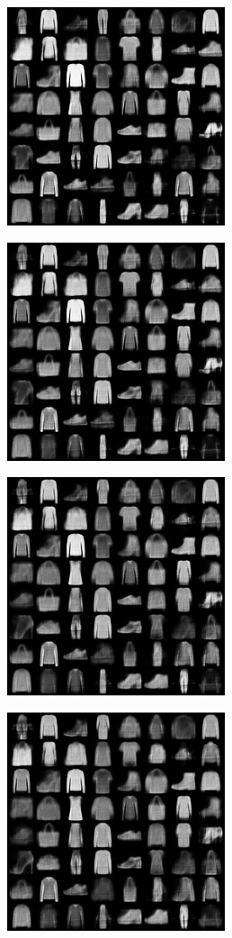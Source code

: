 \begin{figure}[htbp]
    \centering
    \begin{subfigure}
        \centering
        \includegraphics[width=0.32\linewidth]{../images/vae-0.10-merge.png}
        \label{fig:vae_0.1}
    \end{subfigure}
    \begin{subfigure}
        \centering
        \includegraphics[width=0.32\linewidth]{../images/vae-0.20-merge.png}
        \label{fig:vae_0.2}
    \end{subfigure}
    \begin{subfigure}
        \centering
        \includegraphics[width=0.32\linewidth]{../images/vae-0.30-merge.png}
        \label{fig:vae_0.3}
    \end{subfigure}
    \begin{subfigure}
        \centering
        \includegraphics[width=0.32\linewidth]{../images/vae-0.40-merge.png}

\end{subfigure}
\end{figure}

